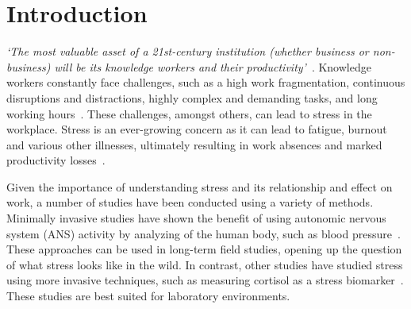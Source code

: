 \section{Introduction}
\textit{`The most valuable asset of a 21st-century institution (whether 
business or non-business) will be its knowledge workers and their 
productivity'}~\cite{drucker1999knowledge}. Knowledge workers constantly face 
challenges, such as a high work fragmentation, continuous disruptions and 
distractions, highly complex and demanding tasks, and long working 
hours~\cite{gonzalez2004constant,mark2008cost,czerwinski04diary}. 
These challenges, amongst others, can lead to stress in the workplace.
Stress is an ever-growing concern as it can lead to
fatigue, burnout and various other illnesses, ultimately resulting in 
work 
absences and marked productivity 
losses~\cite{hockey1997stress,setz2010stress,wrs2010}.

Given the importance of understanding stress and its relationship and
effect on work, a number of studies have been conducted using a
variety of methods. Minimally invasive studies have shown the benefit of using
autonomic nervous system (ANS) activity by analyzing 
of the human body, such as blood pressure~\cite{kataoka00}.
These approaches can be used in long-term field
studies, opening up the question of what stress
looks like in the wild. 
In contrast, other studies have studied stress using more invasive
techniques, such as measuring cortisol as a stress biomarker~\cite{piazza10}. These studies are best suited
for laboratory environments.



